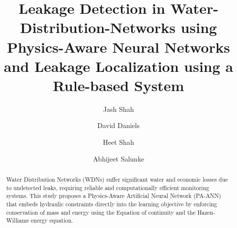 \documentclass[final,5p,times,twocolumn,authoryear]{elsarticle}
\begin{document}
\begin{frontmatter}



\title{Leakage Detection in Water-Distribution-Networks using Physics-Aware Neural Networks and Leakage Localization using a Rule-based System}



\author[inst1,eq]{Jash Shah}
\author[inst1,eq]{David Daniels}
\author[inst1,eq]{Heet Shah}
\author[inst1,eq]{Abhijeet Salunke}

\vspace{0.3cm}



\begin{abstract}
Water Distribution Networks (WDNs) suffer significant water and economic losses due to undetected leaks, requiring reliable and computationally efficient monitoring systems. This study proposes a Physics-Aware Artificial Neural Network (PA-ANN) that embeds hydraulic constraints directly into the learning objective by enforcing conservation of mass and energy using the Equation of continuity and the Hazen-Williams energy equation.


\end{abstract}
\end{frontmatter}
\end{document}
